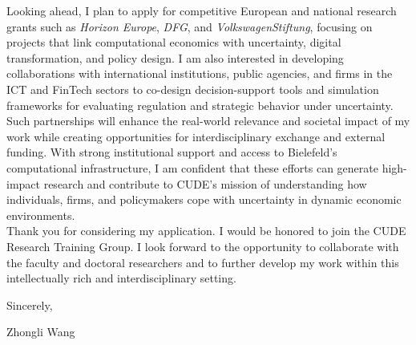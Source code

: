 \documentclass{nfr}
\begin{document}
Looking ahead, I plan to apply for competitive European and national research grants such as \textit{Horizon Europe}, \textit{DFG}, and \textit{VolkswagenStiftung}, focusing on projects that link computational economics with uncertainty, digital transformation, and policy design. 
I am also interested in developing collaborations with international institutions, public agencies, and firms in the ICT and FinTech sectors to co-design decision-support tools and simulation frameworks for evaluating regulation and strategic behavior under uncertainty. 
Such partnerships will enhance the real-world relevance and societal impact of my work while creating opportunities for interdisciplinary exchange and external funding. 
With strong institutional support and access to Bielefeld’s computational infrastructure, I am confident that these efforts can generate high-impact research and contribute to CUDE’s mission of understanding how individuals, firms, and policymakers cope with uncertainty in dynamic economic environments.\\

Thank you for considering my application.
I would be honored to join the CUDE Research Training Group. I look forward to the opportunity to collaborate with the faculty and doctoral researchers and to further develop my work within this intellectually rich and interdisciplinary setting.
\vspace{3mm}

\noindent Sincerely,\\
\vspace{5mm}

\noindent Zhongli Wang

\vspace{5mm}


\end{document}
